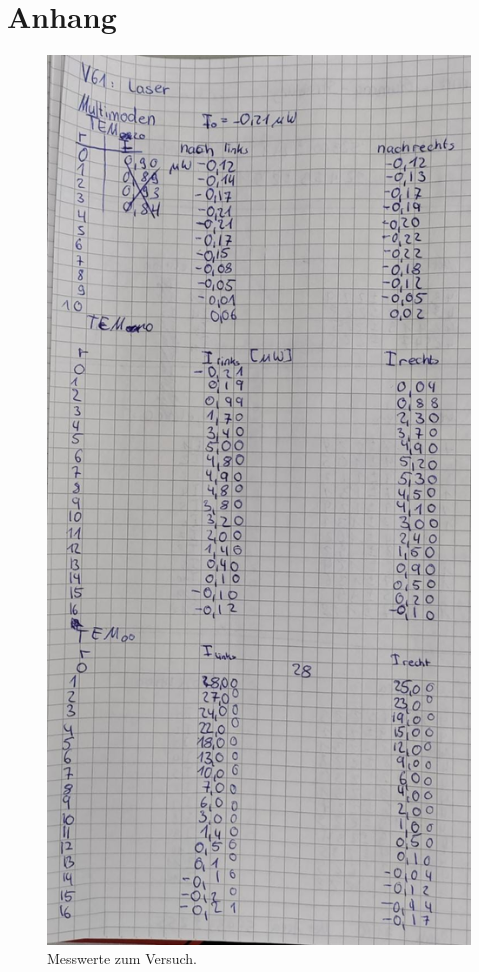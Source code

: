 \section{Anhang}
\label{sec:Anhang}
\begin{figure}[H]
   \centering
    \includegraphics[scale=0.3]{Abbildungen/Kladde1.jpg}
   \caption{Messwerte zum Versuch.}
\end{figure}
